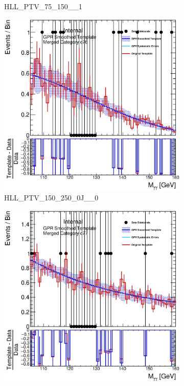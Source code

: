 \begin{figure}
\begin{center}
\begin{subfigure}[T]{0.49\linewidth}
	\caption{HLL\_PTV\_75\_150\_\_1}
\end{subfigure}
\begin{subfigure}[T]{0.49\linewidth}
	\centering
	\includegraphics[width=\linewidth]{figures/background/gpr/coupCatTemplates/GPR_Smoothed_Plot_hmgg_c76.eps}
	\caption{HLL\_PTV\_150\_250\_0J\_\_0}
\end{subfigure}
\begin{subfigure}[T]{0.49\linewidth}
	\centering
	\includegraphics[width=\linewidth]{figures/background/gpr/coupCatTemplates/GPR_Smoothed_Plot_hmgg_c77.eps}

\end{subfigure}
\end{center}
\end{figure}
